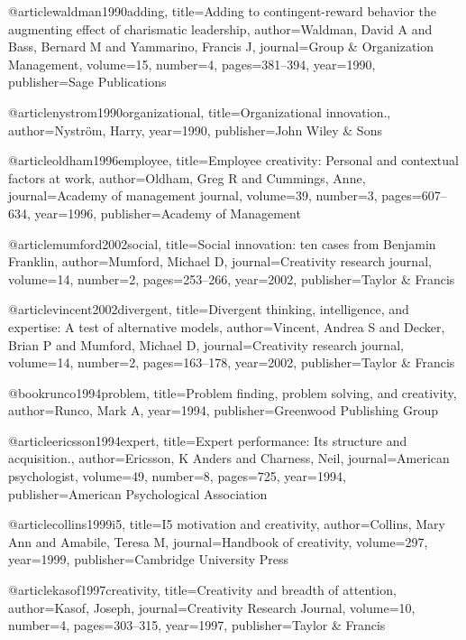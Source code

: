 @article{waldman1990adding,
  title={Adding to contingent-reward behavior the augmenting effect of charismatic leadership},
  author={Waldman, David A and Bass, Bernard M and Yammarino, Francis J},
  journal={Group \& Organization Management},
  volume={15},
  number={4},
  pages={381--394},
  year={1990},
  publisher={Sage Publications}
}

@article{nystrom1990organizational,
  title={Organizational innovation.},
  author={Nystr{\"o}m, Harry},
  year={1990},
  publisher={John Wiley \& Sons}
}

@article{oldham1996employee,
  title={Employee creativity: Personal and contextual factors at work},
  author={Oldham, Greg R and Cummings, Anne},
  journal={Academy of management journal},
  volume={39},
  number={3},
  pages={607--634},
  year={1996},
  publisher={Academy of Management}
}

@article{mumford2002social,
  title={Social innovation: ten cases from Benjamin Franklin},
  author={Mumford, Michael D},
  journal={Creativity research journal},
  volume={14},
  number={2},
  pages={253--266},
  year={2002},
  publisher={Taylor \& Francis}
}

@article{vincent2002divergent,
  title={Divergent thinking, intelligence, and expertise: A test of alternative models},
  author={Vincent, Andrea S and Decker, Brian P and Mumford, Michael D},
  journal={Creativity research journal},
  volume={14},
  number={2},
  pages={163--178},
  year={2002},
  publisher={Taylor \& Francis}
}

@book{runco1994problem,
  title={Problem finding, problem solving, and creativity},
  author={Runco, Mark A},
  year={1994},
  publisher={Greenwood Publishing Group}
}

@article{ericsson1994expert,
  title={Expert performance: Its structure and acquisition.},
  author={Ericsson, K Anders and Charness, Neil},
  journal={American psychologist},
  volume={49},
  number={8},
  pages={725},
  year={1994},
  publisher={American Psychological Association}
}

@article{collins1999i5,
  title={I5 motivation and creativity},
  author={Collins, Mary Ann and Amabile, Teresa M},
  journal={Handbook of creativity},
  volume={297},
  year={1999},
  publisher={Cambridge University Press}
}

@article{kasof1997creativity,
  title={Creativity and breadth of attention},
  author={Kasof, Joseph},
  journal={Creativity Research Journal},
  volume={10},
  number={4},
  pages={303--315},
  year={1997},
  publisher={Taylor \& Francis}
}

